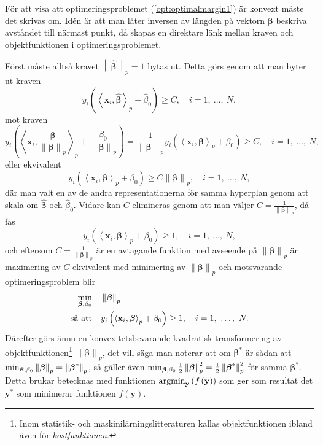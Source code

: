 \documentclass[a4paper, 12pt]{report}
\theoremstyle{definition}
\theoremstyle{remark}
\newcommand{\bfbeta}{{\boldsymbol{\beta}}}
\newcommand{\bfx}{\mathbf{x}}
\newcommand{\bfy}{\mathbf{y}}
\newcommand{\llangle}{\left\langle}
\newcommand{\rrangle}{\right\rangle}
\newcommand{\inner}[2]{\llangle #1, #2 \rrangle}
\begin{document}
För att visa att optimeringsproblemet (\ref{opt:optimalmargin1}) är konvext måste det skrivas om. Idén är att man låter inversen av längden på vektorn $\bfbeta$ beskriva avståndet till närmast punkt, då skapas en direktare länk mellan kraven och objektfunktionen i optimeringsproblemet.

Först måste alltså kravet $\left\|\widehat{\bfbeta}
\right\|_p=1$ bytas ut. Detta görs genom att man byter ut kraven
\begin{equation*}
y_i\left(\inner{\bfx_i}{\widehat{\bfbeta}}_p+\widehat{\beta}_0\right)\geq C,\quad i=1,~\dots,~N,
\end{equation*}
mot kraven
\begin{equation*}
y_i\left(\inner{\bfx_i}{\frac{\bfbeta}{\left\|\bfbeta
\right\|_p}}_p+\frac{\beta_0}{\left\|\bfbeta
\right\|_p}\right) = 
\frac{1}{\left\|\bfbeta
\right\|_p}y_i\left(\inner{\bfx_i}{\bfbeta}_p+\beta_0\right)
 \geq C,\quad i=1,~\dots,~N,
\end{equation*}
eller ekvivalent
\begin{equation*}
y_i\left(\inner{\bfx_i}{\bfbeta}_p+\beta_0\right)\geq C\left\|\bfbeta
\right\|_p,\quad i=1,~\dots,~N,
\end{equation*}
där man valt en av de andra representationerna för samma hyperplan genom att skala om $\widehat{\bfbeta}$ och $\widehat{\beta}_0$. Vidare kan $C$ elimineras genom att man väljer $C=\frac{1}{\left\|\bfbeta
\right\|_p}$, då fås
\begin{equation*}
y_i\left(\inner{\bfx_i}{\bfbeta}_p+\beta_0\right)\geq 1,\quad i=1,~\dots,~N,
\end{equation*}
och eftersom $C=\frac{1}{\left\|\bfbeta
\right\|_p}$ är en avtagande funktion med avseende på $\left\|\bfbeta
\right\|_p$ är maximering av $C$ ekvivalent med minimering av $\left\|\bfbeta
\right\|_p$ och motsvarande optimeringsproblem blir
\begin{equation*}%
\begin{aligned}
\operatornamewithlimits{min}_{\bfbeta, \beta_0} & & &\left\|\bfbeta
\right\|_p\\
\text{så att} & & &y_i\left(\inner{\bfx_i}{\bfbeta}_p+\beta_0\right)\geq 1,\quad i=1,~\dots,~N.
\end{aligned}
\end{equation*}
Därefter görs ännu en konvexitetsbevarande kvadratisk transformering av objektfunktionen\footnote{Inom statistik- och maskinilärningslitteraturen kallas objektfunktionen ibland även för \textit{kostfunktionen}.} $\left\|\bfbeta\right\|_p$, det vill säga man noterar att om $\bfbeta^*$ är sådan att $\operatornamewithlimits{min}_{\bfbeta, \beta_0} \left\|\bfbeta\right\|_p=\left\|\bfbeta^*\right\|_p$, så gäller även $\operatornamewithlimits{min}_{\bfbeta, \beta_0} \frac{1}{2}\left\|\bfbeta\right\|_p^2=\frac{1}{2}\left\|\bfbeta^*\right\|_p^2$ för samma $\bfbeta^*$.
Detta brukar betecknas med funktionen $\operatornamewithlimits{argmin}_{\bfy} \left(f\left(\bfy\right)\right)$ som ger som resultat det $\bfy^*$ som minimerar funktionen $f\left(\bfy\right)$.
\end{document}
